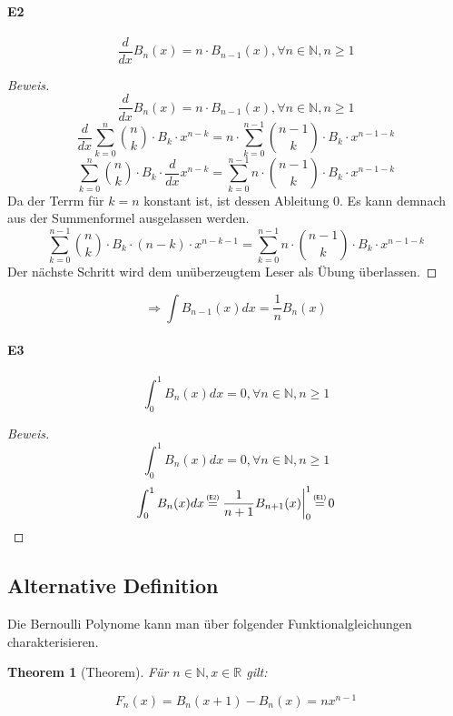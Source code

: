 \documentclass[12pt]{article}
\newcommand{\overtext}[2]{\mathrel{\overset{\makebox[0pt]{\mbox{\normalfont\tiny\sffamily #2}}}{#1}}}
\begin{document}
\paragraph{E2} 
\[\frac{d}{dx} B_n(x) = n \cdot B_{n-1}(x), \forall n\in\mathbb{N}, n \geq 1\]

\begin{proof}[Beweis]
\[\frac{d}{dx} B_n(x) = n \cdot B_{n-1}(x), \forall n\in\mathbb{N}, n \geq 1\]
\[\frac{d}{dx} \sum_{k=0}^n {n \choose k} \cdot B_k \cdot x^{n-k} = n \cdot \sum_{k=0}^{n-1} {n-1 \choose k} \cdot B_k \cdot x^{n-1-k}\]
\[\sum_{k=0}^n {n \choose k} \cdot B_k \cdot \frac{d}{dx} x^{n-k} = \sum_{k=0}^{n-1} n \cdot {n-1 \choose k} \cdot B_k \cdot x^{n-1-k}\]
Da der Terrm für \(k=n\) konstant ist, ist dessen Ableitung 0. Es kann demnach aus der Summenformel ausgelassen werden.
\[\sum_{k=0}^{n-1} {n \choose k} \cdot B_k \cdot (n-k) \cdot x^{n-k-1} = \sum_{k=0}^{n-1} n \cdot {n-1 \choose k} \cdot B_k \cdot x^{n-1-k}\]
Der nächste Schritt wird dem unüberzeugtem Leser als Übung überlassen.
\end{proof}

\[\Longrightarrow \int B_{n-1}(x) dx = \frac{1}{n} B_n(x)\]

\paragraph{E3} 
\[\int_0^1 B_n(x) dx = 0, \forall n\in\mathbb{N}, n \geq 1\]

\begin{proof}[Beweis]
\[\int_0^1 B_n(x) dx = 0, \forall n\in\mathbb{N}, n \geq 1\]
\[\int_0^1 B_n(x) dx \overtext{=}{(E2)} \left. \frac{1}{n+1} B_{n+1}(x) \right|_0^1 \overtext{=}{(E1)} 0\]
\end{proof}

\subsection{Alternative Definition}

Die Bernoulli Polynome kann man über folgender Funktionalgleichungen charakterisieren.

\newtheorem{theorem}{Theorem}[section]
\begin{theorem}[Theorem]
Für \(n \in \mathbb{N}, x \in \mathbb{R}\) gilt:

\[F_n(x) = B_n(x+1) - B_n(x) = nx^{n-1}\]
\end{theorem}
\end{document}
